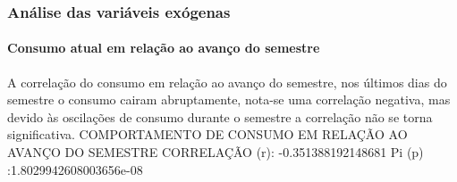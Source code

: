 \documentclass[	12pt, Times, openright, twoside, a4paper, english, brazil]{abntex2}
\begin{document}
    	    \subsubsection{Análise das variáveis exógenas}
    	        \paragraph{Consumo atual em relação ao avanço do semestre}
    	            A correlação do consumo em relação ao avanço do semestre, nos últimos dias do semestre o consumo cairam abruptamente, nota-se uma correlação negativa, mas devido às oscilações de consumo durante o semestre  a correlação não se torna significativa.\newline
    	            COMPORTAMENTO DE CONSUMO EM RELAÇÃO AO AVANÇO DO SEMESTRE\newline 
                    CORRELAÇÃO (r): -0.351388192148681\newline
                    Pi (p) :1.8029942608003656e-08\newline
                    \begin{figure}[H]
                    \end{figure}
                
                \begin{figure}[H]
                \end{figure}
\end{document}
